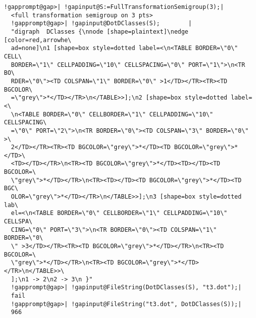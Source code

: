 \documentclass[a4paper,11pt]{report}
\begin{document}
{{{\begin{Verbatim}[commandchars=!@|,fontsize=\small,frame=single,label=Example]
  !gapprompt@gap>| !gapinput@S:=FullTransformationSemigroup(3);|
  <full transformation semigroup on 3 pts>
  !gapprompt@gap>| !gapinput@DotDClasses(S);        |
  "digraph  DClasses {\nnode [shape=plaintext]\nedge [color=red,arrowhe\
  ad=none]\n1 [shape=box style=dotted label=<\n<TABLE BORDER=\"0\" CELL\
  BORDER=\"1\" CELLPADDING=\"10\" CELLSPACING=\"0\" PORT=\"1\">\n<TR BO\
  RDER=\"0\"><TD COLSPAN=\"1\" BORDER=\"0\" >1</TD></TR><TR><TD BGCOLOR\
  =\"grey\">*</TD></TR>\n</TABLE>>];\n2 [shape=box style=dotted label=<\
  \n<TABLE BORDER=\"0\" CELLBORDER=\"1\" CELLPADDING=\"10\" CELLSPACING\
  =\"0\" PORT=\"2\">\n<TR BORDER=\"0\"><TD COLSPAN=\"3\" BORDER=\"0\" >\
  2</TD></TR><TR><TD BGCOLOR=\"grey\">*</TD><TD BGCOLOR=\"grey\">*</TD>\
  <TD></TD></TR>\n<TR><TD BGCOLOR=\"grey\">*</TD><TD></TD><TD BGCOLOR=\
  \"grey\">*</TD></TR>\n<TR><TD></TD><TD BGCOLOR=\"grey\">*</TD><TD BGC\
  OLOR=\"grey\">*</TD></TR>\n</TABLE>>];\n3 [shape=box style=dotted lab\
  el=<\n<TABLE BORDER=\"0\" CELLBORDER=\"1\" CELLPADDING=\"10\" CELLSPA\
  CING=\"0\" PORT=\"3\">\n<TR BORDER=\"0\"><TD COLSPAN=\"1\" BORDER=\"0\
  \" >3</TD></TR><TR><TD BGCOLOR=\"grey\">*</TD></TR>\n<TR><TD BGCOLOR=\
  \"grey\">*</TD></TR>\n<TR><TD BGCOLOR=\"grey\">*</TD></TR>\n</TABLE>>\
  ];\n1 -> 2\n2 -> 3\n }"
  !gapprompt@gap>| !gapinput@FileString(DotDClasses(S), "t3.dot");|
  fail
  !gapprompt@gap>| !gapinput@FileString("t3.dot", DotDClasses(S));|
  966
\end{Verbatim}
 }

 }

 }

 
\end{document}
